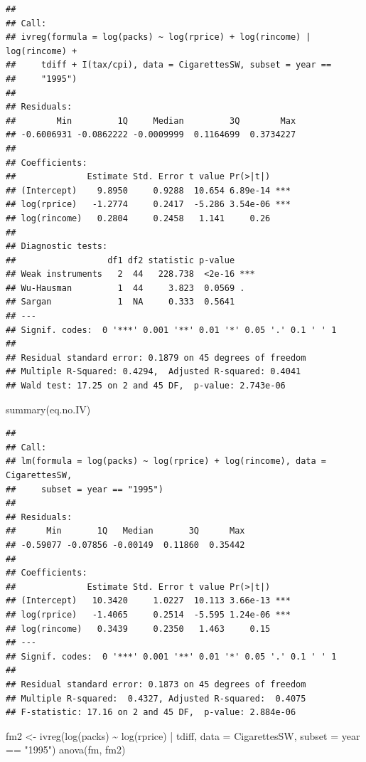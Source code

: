 \documentclass[
]{book}
\newenvironment{Shaded}{\begin{snugshade}}{\end{snugshade}}
\newcommand{\AttributeTok}[1]{\textcolor[rgb]{0.77,0.63,0.00}{#1}}
\newcommand{\FunctionTok}[1]{\textcolor[rgb]{0.00,0.00,0.00}{#1}}
\newcommand{\NormalTok}[1]{#1}
\newcommand{\OtherTok}[1]{\textcolor[rgb]{0.56,0.35,0.01}{#1}}
\newcommand{\SpecialCharTok}[1]{\textcolor[rgb]{0.00,0.00,0.00}{#1}}
\newcommand{\StringTok}[1]{\textcolor[rgb]{0.31,0.60,0.02}{#1}}
\theoremstyle{definition}
\theoremstyle{definition}
\theoremstyle{definition}
\theoremstyle{definition}
\theoremstyle{remark}
\begin{document}
\begin{verbatim}
## 
## Call:
## ivreg(formula = log(packs) ~ log(rprice) + log(rincome) | log(rincome) + 
##     tdiff + I(tax/cpi), data = CigarettesSW, subset = year == 
##     "1995")
## 
## Residuals:
##        Min         1Q     Median         3Q        Max 
## -0.6006931 -0.0862222 -0.0009999  0.1164699  0.3734227 
## 
## Coefficients:
##              Estimate Std. Error t value Pr(>|t|)    
## (Intercept)    9.8950     0.9288  10.654 6.89e-14 ***
## log(rprice)   -1.2774     0.2417  -5.286 3.54e-06 ***
## log(rincome)   0.2804     0.2458   1.141     0.26    
## 
## Diagnostic tests:
##                  df1 df2 statistic p-value    
## Weak instruments   2  44   228.738  <2e-16 ***
## Wu-Hausman         1  44     3.823  0.0569 .  
## Sargan             1  NA     0.333  0.5641    
## ---
## Signif. codes:  0 '***' 0.001 '**' 0.01 '*' 0.05 '.' 0.1 ' ' 1
## 
## Residual standard error: 0.1879 on 45 degrees of freedom
## Multiple R-Squared: 0.4294,  Adjusted R-squared: 0.4041 
## Wald test: 17.25 on 2 and 45 DF,  p-value: 2.743e-06
\end{verbatim}

\begin{Shaded}
\begin{Highlighting}[]
\FunctionTok{summary}\NormalTok{(eq.no.IV)}
\end{Highlighting}
\end{Shaded}

\begin{verbatim}
## 
## Call:
## lm(formula = log(packs) ~ log(rprice) + log(rincome), data = CigarettesSW, 
##     subset = year == "1995")
## 
## Residuals:
##      Min       1Q   Median       3Q      Max 
## -0.59077 -0.07856 -0.00149  0.11860  0.35442 
## 
## Coefficients:
##              Estimate Std. Error t value Pr(>|t|)    
## (Intercept)   10.3420     1.0227  10.113 3.66e-13 ***
## log(rprice)   -1.4065     0.2514  -5.595 1.24e-06 ***
## log(rincome)   0.3439     0.2350   1.463     0.15    
## ---
## Signif. codes:  0 '***' 0.001 '**' 0.01 '*' 0.05 '.' 0.1 ' ' 1
## 
## Residual standard error: 0.1873 on 45 degrees of freedom
## Multiple R-squared:  0.4327, Adjusted R-squared:  0.4075 
## F-statistic: 17.16 on 2 and 45 DF,  p-value: 2.884e-06
\end{verbatim}

\begin{Shaded}
\begin{Highlighting}[]
\NormalTok{fm2 }\OtherTok{\textless{}{-}} \FunctionTok{ivreg}\NormalTok{(}\FunctionTok{log}\NormalTok{(packs) }\SpecialCharTok{\textasciitilde{}} \FunctionTok{log}\NormalTok{(rprice) }\SpecialCharTok{|}\NormalTok{ tdiff, }\AttributeTok{data =}\NormalTok{ CigarettesSW, }\AttributeTok{subset =}\NormalTok{ year }\SpecialCharTok{==} \StringTok{"1995"}\NormalTok{)}
\FunctionTok{anova}\NormalTok{(fm, fm2)}
\end{Highlighting}
\end{Shaded}
\end{document}

